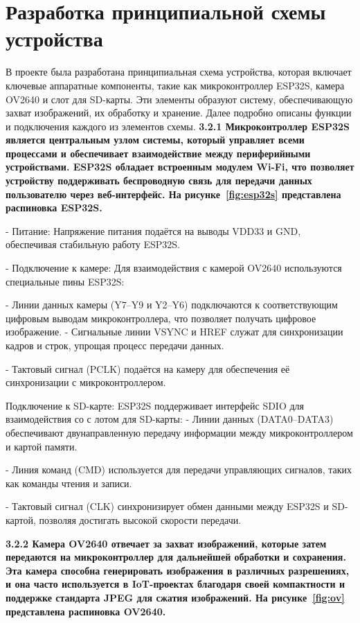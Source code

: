 \section{Разработка принципиальной схемы устройства}\par
\hspace*{12.5 mm}В проекте была разработана принципиальная 
схема устройства, которая включает ключевые аппаратные 
компоненты, такие как микроконтроллер ESP32S, камера OV2640 и 
слот для SD-карты. Эти элементы образуют систему, 
обеспечивающую захват изображений, их обработку и хранение.
Далее подробно описаны функции и подключения каждого из 
элементов схемы.
\bf{3.2.1}  Микроконтроллер ESP32S является центральным 
узлом системы, который управляет всеми процессами и 
обеспечивает взаимодействие между периферийными устройствами. 
ESP32S обладает встроенным модулем Wi-Fi, что позволяет 
устройству поддерживать беспроводную связь для передачи данных 
пользователю через веб-интерфейс. На рисунке~\ref{fig:esp32s} представлена
распиновка ESP32S\cite{ESP-S}.


    - Питание: Напряжение питания подаётся на выводы VDD33 и 
GND, обеспечивая стабильную работу ESP32S.

    - Подключение к камере: Для взаимодействия с камерой OV2640
используются специальные пины ESP32S:

    - Линии данных камеры (Y7–Y9 и Y2–Y6) 
подключаются к соответствующим цифровым выводам 
микроконтроллера, что позволяет получать цифровое изображение.  
    - Сигнальные линии VSYNC и HREF служат для 
синхронизации кадров и строк, упрощая процесс передачи данных.

    - Тактовый сигнал (PCLK) подаётся на 
камеру для обеспечения её синхронизации с микроконтроллером.

    Подключение к SD-карте:
    ESP32S поддерживает интерфейс SDIO для взаимодействия со с
лотом для SD-карты:
    - Линии данных (DATA0–DATA3) обеспечивают двунаправленную 
передачу информации между микроконтроллером и картой памяти.

    - Линия команд (CMD) используется для передачи управляющих 
сигналов, таких как команды чтения и записи.

    - Тактовый сигнал (CLK) синхронизирует обмен данными между 
ESP32S и SD-картой, позволяя достигать высокой скорости 
передачи.

\bf{3.2.2} \normalfont Камера OV2640 отвечает за захват 
изображений, которые затем передаются на микроконтроллер для 
дальнейшей обработки и сохранения. Эта камера способна 
генерировать изображения в различных разрешениях, и она часто 
используется в IoT-проектах благодаря своей компактности и 
поддержке стандарта JPEG для сжатия изображений.
На рисунке~\ref{fig:ov} представлена
распиновка OV2640\cite{OV}.

